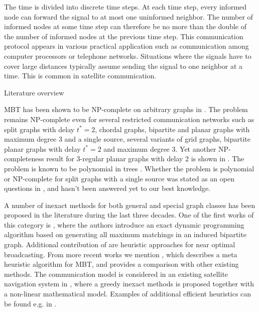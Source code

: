 The time is divided into discrete time steps.
At each time step, every informed node can forward the signal to at most one uninformed neighbor.
The number of informed nodes at some time step can therefore be no more than the double of the number of informed nodes at the previous time step.
This communication protocol appears in various practical application such as communication among computer processors or telephone networks.
Situations where the signals have to cover large distances typically assume sending the signal to one neighbor at a time.
This is common in satellite communication.

{Literature overview}

MBT has been shown to be NP-complete on arbitrary graphs in \cite{slater81}. 
The problem remains NP-complete even for several restricted communication networks \cite{jansen95} such as
split graphs with delay $t^*=2$, chordal graphs,
bipartite and planar graphs with maximum degree 3 and a single source,
several variants of grid graphs,
bipartite planar graphs with delay $t^*=2$ and maximum degree 3. 
Yet another NP-completeness result for 3-regular planar graphs with delay 2 is shown in \cite{middendorf93}.
The problem is known to be polynomial in trees \cite{slater81}.
Whether the problem is polynomial or NP-complete for split graphs with a single source was stated as an open questions in \cite{jansen95}, and hasn't been answered yet to our best knowledge.

A number of inexact methods for both general and special graph classes has been proposed in the literature during the last three decades.
One of the first works of this category is \cite{scheuermann84}, 
where the authors introduce an exact dynamic programming algorithm based on generating all maximum matchings in an induced bipartite graph.
Additional contribution of \cite{scheuermann84} are heuristic approaches for near optimal broadcasting.
From more recent works we mention \cite{hasson04}, which describes a meta heuristic algorithm for MBT, and provides a comparison with other existing methods.
The communication model is considered in an existing satellite navigation system in \cite{chu17}, where a greedy inexact methods is proposed together with a non-linear mathematical model.
Examples of additional efficient heuristics can be found e.g. in \cite{harutyunyan06,harutyunyan14,wang10,jimborean13}.

